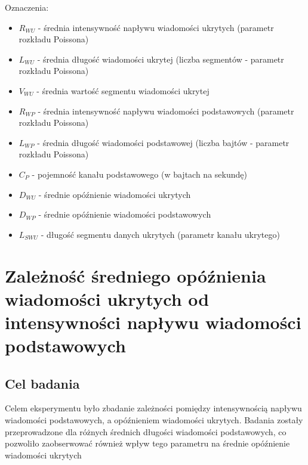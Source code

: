 \documentclass[a4paper, twoside, 12pt]{report}
\begin{document}
    Oznaczenia:
    \begin{itemize} \itemsep1pt \parskip0pt 
        \item \( R_{WU} \) - średnia intensywność napływu wiadomości ukrytych (parametr rozkładu Poissona)
        \item \( L_{WU} \) - średnia długość wiadomości ukrytej (liczba segmentów - parametr rozkładu Poissona)
        \item \( V_{WU} \) - średnia wartość segmentu wiadomości ukrytej
        \item \( R_{WP} \) - średnia intensywność napływu wiadomości podstawowych (parametr rozkładu Poissona)
        \item \( L_{WP} \) - średnia długość wiadomości podstawowej (liczba bajtów - parametr rozkładu Poissona)
        \item \( C_P \) - pojemność kanału podstawowego (w bajtach na sekundę)
        \item \( D_{WU} \) - średnie opóźnienie wiadomości ukrytych
        \item \( D_{WP} \) - średnie opóźnienie wiadomości podstawowych
        \item \( L_{SWU} \) - długość segmentu danych ukrytych (parametr kanału ukrytego)
    \end{itemize}

    \section{Zależność średniego opóźnienia wiadomości ukrytych od intensywności napływu wiadomości podstawowych}
        \subsection{Cel badania}
            Celem eksperymentu było zbadanie zależności pomiędzy intensywnością
            napływu wiadomości podstawowych, a opóźnieniem wiadomości ukrytych.
            Badania zostały przeprowadzone dla różnych średnich długości wiadomości
            podstawowych, co pozwoliło zaobserwować również wpływ tego parametru
            na średnie opóźnienie wiadomości ukrytych
\end{document}
